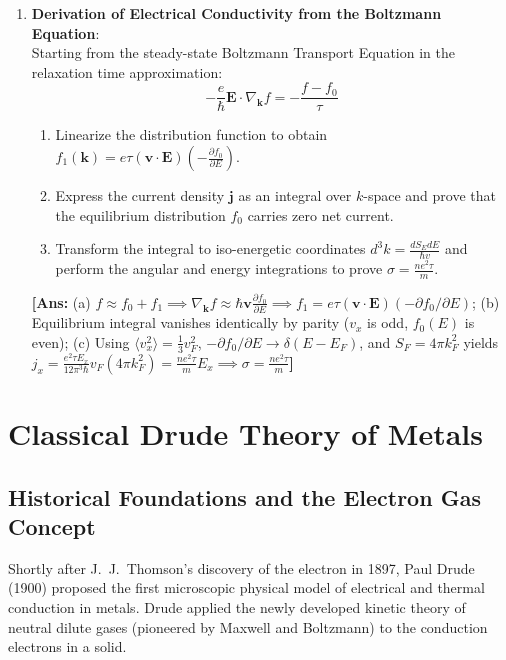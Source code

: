 \documentclass[11pt,a4paper]{article}
\newcommand{\vb}[1]{\mathbf{#1}}
\begin{document}
\begin{enumerate}[label=\textbf{\arabic*.}, resume, leftmargin=*]
    \item \textbf{Derivation of Electrical Conductivity from the Boltzmann Equation}:\\
    Starting from the steady-state Boltzmann Transport Equation in the relaxation time approximation:
    \[
    -\frac{e}{\hbar}\vb{E}\cdot\nabla_{\vb{k}}f = -\frac{f - f_0}{\tau}
    \]
    \begin{enumerate}[label=(\alph*)]
        \item Linearize the distribution function to obtain $f_1(\vb{k}) = e\tau(\vb{v}\cdot\vb{E})\left(-\frac{\partial f_0}{\partial E}\right)$.
        \item Express the current density $\vb{j}$ as an integral over $k$-space and prove that the equilibrium distribution $f_0$ carries zero net current.
        \item Transform the integral to iso-energetic coordinates $d^3k = \frac{dS_E dE}{\hbar v}$ and perform the angular and energy integrations to prove $\sigma = \frac{n e^2 \tau}{m}$.
    \end{enumerate}
    \textbf{[Ans:} (a) $f \approx f_0 + f_1 \implies \nabla_{\vb{k}}f \approx \hbar\vb{v}\frac{\partial f_0}{\partial E} \implies f_1 = e\tau(\vb{v}\cdot\vb{E})(-\partial f_0/\partial E)$; (b) Equilibrium integral vanishes identically by parity ($v_x$ is odd, $f_0(E)$ is even); (c) Using $\langle v_x^2 \rangle = \frac{1}{3}v_F^2$, $-\partial f_0/\partial E \to \delta(E - E_F)$, and $S_F = 4\pi k_F^2$ yields $j_x = \frac{e^2\tau E_x}{12\pi^3\hbar}v_F(4\pi k_F^2) = \frac{ne^2\tau}{m}E_x \implies \sigma = \frac{ne^2\tau}{m}$\textbf{]}
\end{enumerate}

\clearpage


\section{Classical Drude Theory of Metals}
\label{sec:drude_theory}

\subsection{Historical Foundations and the Electron Gas Concept}
Shortly after J.~J.~Thomson's discovery of the electron in 1897, Paul Drude (1900) proposed the first microscopic physical model of electrical and thermal conduction in metals. Drude applied the newly developed kinetic theory of neutral dilute gases (pioneered by Maxwell and Boltzmann) to the conduction electrons in a solid. 
\end{document}
